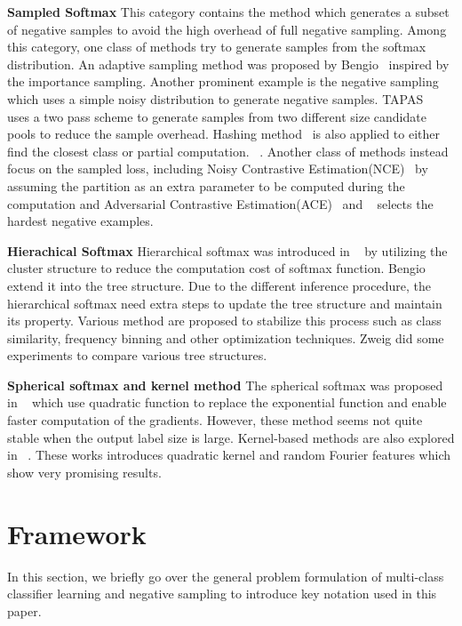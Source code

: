 \textbf{Sampled Softmax} This category contains the method which generates a subset of negative samples to avoid the high overhead of full negative sampling. Among this category, one class of methods try to generate samples from the softmax distribution. An adaptive sampling method was proposed by Bengio~\citep{bengio2008adaptive} inspired by the importance sampling. Another prominent example is the negative sampling~\citep{mikolov2013efficient} which uses a simple noisy distribution to generate negative samples. TAPAS~\citep{bai2017tapas} uses a two pass scheme to generate samples from two different size candidate pools to reduce the sample overhead. Hashing method~\citep{bakhtiary2015speeding, vijayanarasimhan2014deep} is also applied to either find the closest class or partial computation.  ~\citep{rawat2019sampled}. 
Another class of methods instead focus on the sampled loss, including Noisy Contrastive Estimation(NCE)~\citep{NCE} by assuming the partition as an extra parameter to be computed during the computation and Adversarial Contrastive Estimation(ACE)~\citep{bose2018adversarial} and ~\citep{schroff2015facenet,mussmann2017fast} selects the hardest negative examples.

\textbf{Hierachical Softmax}
Hierarchical softmax was introduced in ~\citep{Goodman} by utilizing the cluster structure to reduce the computation cost of softmax function. Bengio~\citep{morin2005hierarchical} extend it into the tree structure. Due to the different inference procedure, the hierarchical softmax need extra steps to update the tree structure and maintain its property. Various method are proposed to stabilize this process such as class similarity, frequency binning and other optimization techniques. Zweig did some experiments to compare various  tree structures. 

\textbf{Spherical softmax and kernel method}
The spherical softmax was proposed in ~\citep{vincent2015efficient,de2015exploration} which use quadratic function to replace the exponential function and enable faster computation of the gradients. However, these method seems not quite stable when the output label size is large. Kernel-based methods are also explored in ~\citep{blanc2017adaptive,rawat2019sampled}. These works introduces quadratic kernel and random Fourier features which show very promising results.
\section{Framework}
\label{sec:NS:framework}
In this section, we briefly go over the general problem formulation of multi-class classifier learning and negative sampling to introduce key notation used in this paper.
